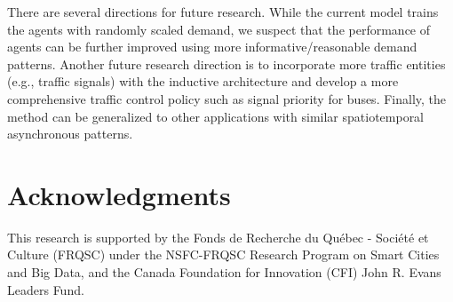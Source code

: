 \documentclass{article}
\begin{document}
There are several directions for future research. While the current model trains the agents with randomly scaled demand, we suspect that the performance of agents can be further improved using more informative/reasonable demand patterns. Another future research direction is to incorporate more traffic entities (e.g., traffic signals) with the inductive architecture and develop a more comprehensive traffic control policy such as signal priority for buses. Finally, the method can be generalized to other applications with similar spatiotemporal asynchronous patterns.

\section*{Acknowledgments}
This research is supported by the Fonds de Recherche du Qu\'{e}bec - Soci\'{e}t\'{e} et Culture (FRQSC) under the NSFC-FRQSC Research Program on Smart Cities and Big Data, and the Canada Foundation for Innovation (CFI) John R. Evans Leaders Fund.




\end{document}
